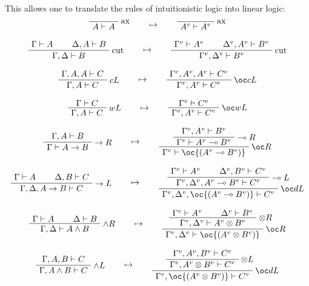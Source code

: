 This allows one to translate the rules of intuitionistic logic into linear logic:
\begin{gather*}
\LabelRule{\rulename{ax}}
\NulRule{A\vdash A}
\DisplayProof
\qquad\mapsto\qquad
\LabelRule{\rulename{ax}}
\NulRule{A^v\vdash A^v}
\DisplayProof
\\[2ex]
\AxRule{\Gamma\vdash A}
\AxRule{\Delta,A\vdash B}
\LabelRule{\rulename{cut}}
\BinRule{\Gamma,\Delta\vdash B}
\DisplayProof
\qquad\mapsto\qquad
\AxRule{\Gamma^v\vdash A^v}
\AxRule{\Delta^v,A^v\vdash B^v}
\LabelRule{\rulename{cut}}
\BinRule{\Gamma^v,\Delta^v\vdash B^v}
\DisplayProof
\\[2ex]
\AxRule{\Gamma,A,A\vdash C}
\LabelRule{c L}
\UnaRule{\Gamma,A\vdash C}
\DisplayProof
\qquad\mapsto\qquad
\AxRule{\Gamma^v,A^v,A^v\vdash C^v}
\LabelRule{\oc c L}
\UnaRule{\Gamma^v,A^v\vdash C^v}
\DisplayProof
\\[2ex]
\AxRule{\Gamma\vdash C}
\LabelRule{w L}
\UnaRule{\Gamma,A\vdash C}
\DisplayProof
\qquad\mapsto\qquad
\AxRule{\Gamma^v\vdash C^v}
\LabelRule{\oc w L}
\UnaRule{\Gamma^v,A^v\vdash C^v}
\DisplayProof
\\[2ex]
\AxRule{\Gamma,A\vdash B}
\LabelRule{\imp R}
\UnaRule{\Gamma\vdash A\imp B}
\DisplayProof
\qquad\mapsto\qquad
\AxRule{\Gamma^v,A^v\vdash B^v}
\LabelRule{\limp R}
\UnaRule{\Gamma^v\vdash A^v\limp B^v}
\LabelRule{\oc R}
\UnaRule{\Gamma^v\vdash \oc{(A^v\limp B^v)}}
\DisplayProof
\\[2ex]
\AxRule{\Gamma\vdash A}
\AxRule{\Delta,B\vdash C}
\LabelRule{\imp L}
\BinRule{\Gamma,\Delta,A\imp B\vdash C}
\DisplayProof
\qquad\mapsto\qquad
\AxRule{\Gamma^v\vdash A^v}
\AxRule{\Delta^v,B^v\vdash C^v}
\LabelRule{\limp L}
\BinRule{\Gamma^v,\Delta^v,A^v\limp B^v\vdash C^v}
\LabelRule{\oc d L}
\UnaRule{\Gamma^v,\Delta^v,\oc{(A^v\limp B^v)}\vdash C^v}
\DisplayProof
\\[2ex]
\AxRule{\Gamma\vdash A}
\AxRule{\Delta\vdash B}
\LabelRule{\wedge R}
\BinRule{\Gamma,\Delta\vdash A\wedge B}
\DisplayProof
\qquad\mapsto\qquad
\AxRule{\Gamma^v\vdash A^v}
\AxRule{\Delta^v\vdash B^v}
\LabelRule{\tens R}
\BinRule{\Gamma^v,\Delta^v\vdash A^v\tens B^v}
\LabelRule{\oc R}
\UnaRule{\Gamma^v,\Delta^v\vdash \oc{(A^v\tens B^v)}}
\DisplayProof
\\[2ex]
\AxRule{\Gamma,A,B\vdash C}
\LabelRule{\wedge L}
\UnaRule{\Gamma,A\wedge B\vdash C}
\DisplayProof
\qquad\mapsto\qquad
\AxRule{\Gamma^v,A^v,B^v\vdash C^v}
\LabelRule{\tens L}
\UnaRule{\Gamma^v,A^v\tens B^v\vdash C^v}
\LabelRule{\oc d L}
\UnaRule{\Gamma^v,\oc{(A^v\tens B^v)}\vdash C^v}
\DisplayProof
\\[2ex]

\end{gather*}
